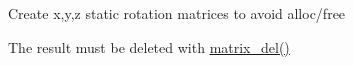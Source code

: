 
\begin{DoxyRefList}
\item[\label{bug__bug000001}%
\hypertarget{bug__bug000001}{}%
Global \hyperlink{matrix_8c_a2e2541f2040177403b95e30f38b232fe}{matrix\+\_\+rot\+\_\+x} (matrix\+\_\+t $\ast$m, double theta)]Create x,y,z static rotation matrices to avoid alloc/free
\begin{DoxyItemize}
\item The result must be deleted with \hyperlink{matrix_8c_a8277c0c702668ac9c20d5b4fbbb1c805}{matrix\+\_\+del()} 
\end{DoxyItemize}
\end{DoxyRefList}